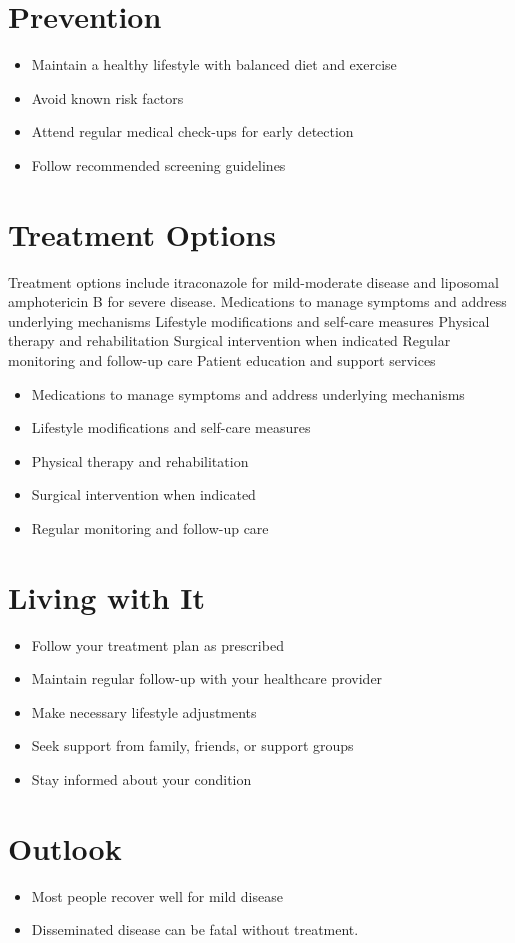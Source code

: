 \section{Prevention}
\begin{itemize}[noitemsep]
  \item Maintain a healthy lifestyle with balanced diet and exercise
  \item Avoid known risk factors
  \item Attend regular medical check-ups for early detection
  \item Follow recommended screening guidelines
\end{itemize}
\section{Treatment Options}
Treatment options include itraconazole for mild-moderate disease and liposomal amphotericin B for severe disease. Medications to manage symptoms and address underlying mechanisms Lifestyle modifications and self-care measures Physical therapy and rehabilitation Surgical intervention when indicated Regular monitoring and follow-up care Patient education and support services

\begin{itemize}[noitemsep]
  \item Medications to manage symptoms and address underlying mechanisms
  \item Lifestyle modifications and self-care measures
  \item Physical therapy and rehabilitation
  \item Surgical intervention when indicated
  \item Regular monitoring and follow-up care
\end{itemize}
\section{Living with It}
\begin{itemize}[noitemsep]
  \item Follow your treatment plan as prescribed
  \item Maintain regular follow-up with your healthcare provider
  \item Make necessary lifestyle adjustments
  \item Seek support from family, friends, or support groups
  \item Stay informed about your condition
\end{itemize}
\section{Outlook}
\begin{itemize}[noitemsep]
  \item Most people recover well for mild disease
  \item Disseminated disease can be fatal without treatment.
\end{itemize}
